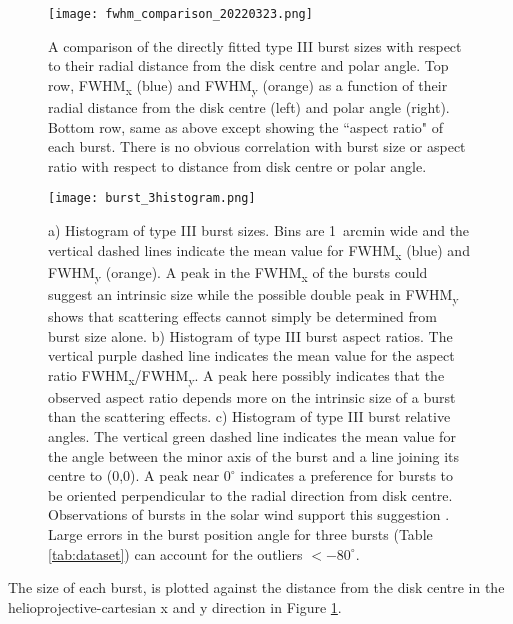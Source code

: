\begin{figure}
\centering
\texttt{[image: fwhm\_comparison\_20220323.png]}
\caption[Directly fitted type III burst sizes as a function of position relative to disk centre.]{A comparison of the directly fitted type III burst sizes with respect to their radial distance from the disk centre and polar angle. Top row, FWHM\textsubscript{x} (blue) and FWHM\textsubscript{y} (orange) as a function of their radial distance from the disk centre (left) and polar angle (right). Bottom row, same as above except showing the ``aspect ratio" of each burst. There is no obvious correlation with burst size or aspect ratio with respect to distance from disk centre or polar angle.}
\label{fig:fwhm_comp}
\end{figure}

\begin{figure}
\centering
\texttt{[image: burst\_3histogram.png]}
\caption[Histograms of type III burst sizes, aspect ratios and relative angles.]{a) Histogram of type III burst sizes. Bins are 1~arcmin wide and the vertical dashed lines indicate the mean value for FWHM\textsubscript{x} (blue) and FWHM\textsubscript{y} (orange). A peak in the FWHM\textsubscript{x} of the bursts could suggest an intrinsic size while the possible double peak in FWHM\textsubscript{y} shows that scattering effects cannot simply be determined from burst size alone. b) Histogram of type III burst aspect ratios. The vertical purple dashed line indicates the mean value for the aspect ratio FWHM\textsubscript{x}/FWHM\textsubscript{y}. A peak here possibly indicates that the observed aspect ratio depends more on the intrinsic size of a burst than the scattering effects. c) Histogram of type III burst relative angles. The vertical green dashed line indicates the mean value for the angle between the minor axis of the burst and a line joining its centre to (0,0). A peak near $0^\circ$ indicates a preference for bursts to be oriented perpendicular to the radial direction from disk centre. Observations of bursts in the solar wind support this suggestion \citep{Anantharamaiah1994,SasikumarRaja2016}. Large errors in the burst position angle for three bursts (Table \ref{tab:dataset}) can account for the outliers $< -80^\circ$.}
\label{fig:burst_hist}
\end{figure}
The size of each burst, is plotted against the distance from the disk centre in the helioprojective-cartesian x and y direction in Figure \ref{fig:fwhm_comp}. 
